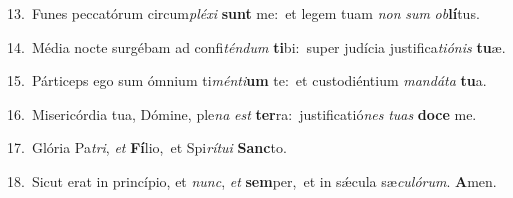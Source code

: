 {\numbfont\textcolor{\numbcolor}{13.}}~Funes peccatórum circum\-\textit{plé}\-\textit{xi} \textbf{sunt} me:~\star et legem tuam \textit{non} \textit{sum} \textit{ob}\-\textbf{lí}tus.\par
{\numbfont\textcolor{\numbcolor}{14.}}~Média nocte surgébam ad confi\-\textit{tén}\-\textit{dum} \textbf{ti}\-bi:~\star super judícia justifica\-\textit{ti}\-\textit{ó}\textit{nis} \textbf{tu}\-æ.\par
{\numbfont\textcolor{\numbcolor}{15.}}~Párticeps ego sum ómnium ti\-\textit{mén}\-\textit{ti}\textbf{um} te:~\star et custodiéntium \textit{man}\-\textit{dá}\textit{ta} \textbf{tu}\-a.\par
{\numbfont\textcolor{\numbcolor}{16.}}~Misericórdia tua, Dómine, ple\textit{na} \textit{est} \textbf{ter}\-ra:~\star justificatió\textit{nes} \textit{tu}\-\textit{as} \textbf{do}\-\textbf{ce} me.\par
{\numbfont\textcolor{\numbcolor}{17.}}~Glória Pa\-\textit{tri}\-, \textit{et} \textbf{Fí}\-lio,~\star et Spi\-\textit{rí}\-\textit{tu}\textit{i} \textbf{Sanc}\-to.\par
{\numbfont\textcolor{\numbcolor}{18.}}~Sicut erat in princípio, et \textit{nunc}\-, \textit{et} \textbf{sem}\-per,~\star et in sǽcula sæ\-\textit{cu}\-\textit{ló}\textit{rum}. \textbf{A}\-men.\par
